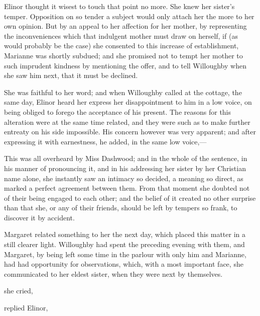 Elinor thought it wisest to touch that point no more. She knew her sister's temper. Opposition on so tender a subject would only attach her the more to her own opinion. But by an appeal to her affection for her mother, by representing the inconveniences which that indulgent mother must draw on herself, if (as would probably be the case) she consented to this increase of establishment, Marianne was shortly subdued; and she promised not to tempt her mother to such imprudent kindness by mentioning the offer, and to tell Willoughby when she saw him next, that it must be declined.

She was faithful to her word; and when Willoughby called at the cottage, the same day, Elinor heard her express her disappointment to him in a low voice, on being obliged to forego the acceptance of his present. The reasons for this alteration were at the same time related, and they were such as to make further entreaty on his side impossible. His concern however was very apparent; and after expressing it with earnestness, he added, in the same low voice,---

This was all overheard by Miss Dashwood; and in the whole of the sentence, in his manner of pronouncing it, and in his addressing her sister by her Christian name alone, she instantly saw an intimacy so decided, a meaning so direct, as marked a perfect agreement between them. From that moment she doubted not of their being engaged to each other; and the belief of it created no other surprise than that she, or any of their friends, should be left by tempers so frank, to discover it by accident.

Margaret related something to her the next day, which placed this matter in a still clearer light. Willoughby had spent the preceding evening with them, and Margaret, by being left some time in the parlour with only him and Marianne, had had opportunity for observations, which, with a most important face, she communicated to her eldest sister, when they were next by themselves.

 she cried, 

 replied Elinor, 

